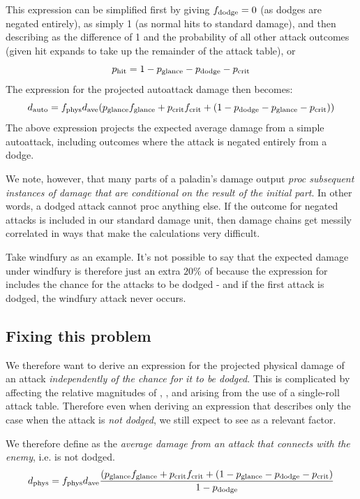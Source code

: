 This expression can be simplified first by giving $f_{\mathrm{dodge}}  = 0$ (as dodges are negated entirely), \fhit as simply 1 (as normal hits to standard damage), and then describing \phit as the difference of 1 and the probability of all other attack outcomes (given hit expands to take up the remainder of the attack table), or
\begin{equation}
	p_{\mathrm{hit}}  = 1 - p_{\mathrm{glance}}  - p_{\mathrm{dodge}}  - p_{\mathrm{crit}} 
\end{equation}
The expression for the projected autoattack damage then becomes:
\begin{equation}
	d_{\mathrm{auto}}  = f_{\mathrm{phys}}  d_{\mathrm{ave}}  (p_{\mathrm{glance}}  f_{\mathrm{glance}}  + p_{\mathrm{crit}}  f_{\mathrm{crit}}  + (1 - p_{\mathrm{dodge}}  - p_{\mathrm{glance}}  - p_{\mathrm{crit}} ))
\end{equation}
The above expression projects the expected average damage from a simple autoattack, including outcomes where the attack is negated entirely from a dodge.

We note, however, that many parts of a paladin's damage output \emph{proc subsequent instances of damage that are conditional on the result of the initial part}.
In other words, a dodged attack cannot proc anything else.
If the outcome for negated attacks is included in our standard damage unit, then damage chains get messily correlated in ways that make the calculations very difficult.

Take windfury as an example.
It's not possible to say that the expected damage under windfury is therefore just an extra $20\%$ of \dauto because the expression for \dauto includes the chance for the attacks to be dodged - and if the first attack is dodged, the windfury attack never occurs.

\subsection{Fixing this problem}
We therefore want to derive an expression for the projected physical damage of an attack \emph{independently of the chance for it to be dodged}.
This is complicated by \pdodge affecting the relative magnitudes of \phit, \pglance, and \pcrit arising from the use of a single-roll attack table.
Therefore even when deriving an expression that describes only the case when the attack is \emph{not dodged}, we still expect to see \pdodge as a relevant factor.

We therefore define \dphys as the \emph{average damage from an attack that connects with the enemy}, i.e. is not dodged.
\begin{equation}
	d_{\mathrm{phys}}  = f_{\mathrm{phys}}  d_{\mathrm{ave}}  \frac{(p_{\mathrm{glance}}  f_{\mathrm{glance}}  + p_{\mathrm{crit}}  f_{\mathrm{crit}}  + (1 - p_{\mathrm{glance}}  - p_{\mathrm{dodge}}  - p_{\mathrm{crit}} )}{1 - p_{\mathrm{dodge}} }
\end{equation}


